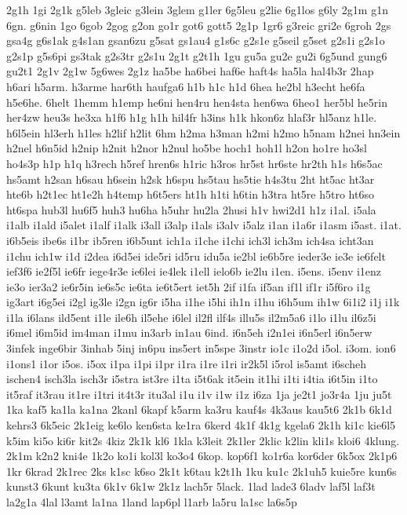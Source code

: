 {2g1h
1gi
2g1k
g5leb
3gleic
g3lein
3glem
g1ler
6g5leu
g2lie
6g1los
g6ly
2g1m
g1n
6gn.
g6nin
1go
6gob
2gog
g2on
go1r
got6
gott5
2g1p
1gr6
g3reic
gri2e
6groh
2gs
gsa4g
g6s1ak
g4s1an
gsan6zu
g5sat
gs1au4
g1s6c
g2s1e
g5seil
g5set
g2s1i
g2s1o
g2s1p
g5s6pi
gs3tak
g2s3tr
g2s1u
2g1t
g2t1h
1gu
gu5a
gu2e
gu2i
6g5und
gung6
gu2t1
2g1v
2g1w
5g6wes
2g1z
ha5be
ha6bei
haf6e
haft4s
ha5la
hal4b3r
2hap
h6ari
h5arm.
h3arme
har6th
haufga6
h1b
h1c
h1d
6hea
he2bl
h3echt
he6fa
h5e6he.
6helt
1hemm
h1emp
he6ni
hen4ru
hen4sta
hen6wa
6heo1
her5bl
he5rin
her4zw
heu3s
he3xa
h1f6
h1g
h1h
hil4fr
h3ins
h1k
hkon6z
hlaf3r
hl5anz
h1le.
h6l5ein
hl3erh
h1les
h2lif
h2lit
6hm
h2ma
h3man
h2mi
h2mo
h5nam
h2nei
hn3ein
h2nel
h6n5id
h2nip
h2nit
h2nor
h2nul
ho5be
hoch1
hoh1l
h2on
ho1re
ho3sl
ho4s3p
h1p
h1q
h3rech
h5ref
hren6s
h1ric
h3ros
hr5st
hr6ste
hr2th
h1s
h6s5ac
hs5amt
h2san
h6sau
h6sein
h2sk
h6spu
hs5tau
hs5tie
h4s3tu
2ht
ht5ac
ht3ar
hte6b
h2t1ec
ht1e2h
h4temp
h6t5ers
ht1h
h1ti
h6tin
h3tra
ht5re
h5tro
ht6so
ht6spa
hub3l
hu6f5
huh3
hu6ha
h5uhr
hu2la
2husi
h1v
hwi2d1
h1z
i1al.
i5ala
i1alb
i1ald
i5alet
i1alf
i1alk
i3all
i3alp
i1als
i3alv
i5alz
i1an
i1a6r
i1asm
i5ast.
i1at.
i6b5eis
ibe6s
i1br
ib5ren
i6b5unt
ich1a
i1che
i1chi
ich3l
ich3m
ich4sa
icht3an
i1chu
ich1w
i1d
i2dea
i6d5ei
ide5ri
id5ru
idu5a
ie2bl
ie6b5re
ieder3e
ie3e
ie6felt
ief3f6
ie2f5l
ie6fr
iege4r3e
ie6lei
ie4lek
i1ell
ielo6b
ie2lu
i1en.
i5ens.
i5env
i1enz
ie3o
ier3a2
ie6r5in
ie6s5c
ie6ta
ie6t5ert
iet5h
2if
i1fa
if5an
if1l
if1r
i5f6ro
i1g
ig3art
i6g5ei
i2gl
ig3le
i2gn
ig6r
i5ha
i1he
i5hi
ih1n
i1hu
i6h5um
ih1w
6i1i2
i1j
i1k
i1la
i6lans
ild5ent
i1le
ile6h
il5ehe
i6lel
il2fl
ilf4s
illu5s
il2m5a6
i1lo
i1lu
il6z5i
i6mel
i6m5id
im4man
i1mu
in3arb
in1au
6ind.
i6n5eh
i2n1ei
i6n5erl
i6n5erw
3infek
inge6bir
3inhab
5inj
in6pu
ins5ert
in5spe
3instr
io1c
i1o2d
i5ol.
i3om.
ion6
i1ons1
i1or
i5os.
i5ox
i1pa
i1pi
i1pr
i1ra
i1re
i1ri
ir2k5l
i5rol
is5amt
i6scheh
ischen4
isch3la
isch3r
i5stra
ist3re
i1ta
i5t6ak
it5ein
it1hi
i1ti
i4tia
i6t5in
i1to
it5raf
it3rau
it1re
i1tri
it4t3r
itu3al
i1u
i1v
i1w
i1z
i6za
1ja
je2t1
jo3r4a
1ju
ju5t
1ka
kaf5
ka1la
ka1na
2kanl
6kapf
k5arm
ka3ru
kauf4s
4k3aus
kau5t6
2k1b
6k1d
kehrs3
6k5eic
2k1eig
ke6lo
ken6sta
ke1ra
6kerd
4k1f
4k1g
kgela6
2k1h
ki1c
kie6l5
k5im
ki5o
ki6r
kit2s
4kiz
2k1k
kl6
1kla
k3leit
2k1ler
2klic
k2lin
kli1s
kloi6
4klung.
2k1m
k2n2
kni4e
1k2o
ko1i
kol3l
ko3o4
6kop.
kop6f1
ko1r6a
kor6der
6k5ox
2k1p6
1kr
6krad
2k1rec
2ks
k1sc
k6so
2k1t
k6tau
k2t1h
1ku
ku1c
2k1uh5
kuie5re
kun6s
kunst3
6kunt
ku3ta
6k1v
6k1w
2k1z
lach5r
5lack.
1lad
lade3
6ladv
laf5l
laf3t
la2g1a
4lal
l3amt
la1na
1land
lap6pl
l1arb
la5ru
la1sc
la6s5p
}
